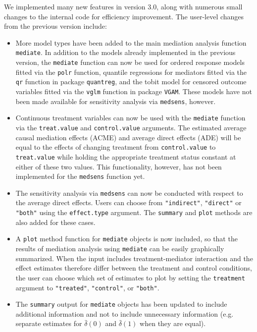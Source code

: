 \documentclass[11pt,letterpaper]{article}
\theoremstyle{plain}
\begin{document}
We implemented many new features in version 3.0,
along with numerous small changes to the internal code for efficiency
improvement.  The user-level changes from the previous version include:

\begin{itemize}
\item More model types have been added to the main mediation analysis function {\tt mediate}.
In addition to the models already implemented in the previous version, the {\tt mediate}
function can now be used for ordered response models fitted via the {\tt polr}
function, quantile regressions for mediators fitted via the {\tt qr} function in package
{\tt quantreg}, and the tobit model for censored outcome variables fitted via the
{\tt vglm} function in package {\tt VGAM}.  These models have not been made available
for sensitivity analysis via {\tt medsens}, however.

\item Continuous treatment variables can now be used with the {\tt mediate} function
via the {\tt treat.value} and {\tt control.value} arguments.  The estimated average
causal mediation effects (ACME) and average direct effects (ADE) will be equal to the
effects of changing treatment from {\tt control.value} to {\tt treat.value} while
holding the appropriate treatment status constant at either of these two values.
This functionality, however, has not been implemented for the {\tt medsens} function yet.

\item The sensitivity analysis via {\tt medsens} can now be conducted with respect
to the average direct effects.  Users can choose from {\tt "indirect"}, {\tt "direct"}
or {\tt "both"} using the {\tt effect.type} argument.  The {\tt summary} and {\tt plot}
methods are also added for these cases.

\item A {\tt plot} method function for {\tt mediate} objects is now included,
so that the results of mediation analysis using {\tt mediate} can be easily graphically
summarized.  When the input includes treatment-mediator interaction and the effect estimates
therefore differ between the treatment and control conditions, the user can choose which
set of estimates to plot by setting the {\tt treatment} argument to {\tt "treated"},
{\tt "control"}, or {\tt "both"}.

\item The {\tt summary} output for {\tt mediate} objects has been updated to include
additional information and not to include unnecessary information (e.g. separate estimates
for $\bar\delta(0)$ and $\bar\delta(1)$ when they are equal).


\end{itemize}
\end{document}
